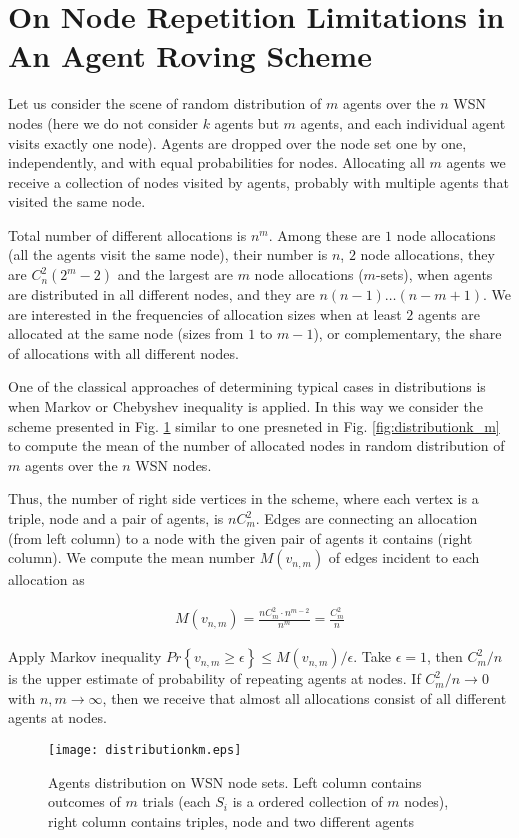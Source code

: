 \documentclass[conference]{IEEEtran}
\begin{document}
\section{On Node Repetition Limitations in An Agent Roving Scheme}

Let us consider the scene of random distribution of $m$ agents over the $n$ WSN nodes (here we do not consider $k$ agents but $m$ agents, and each individual agent visits exactly one node). Agents are dropped over the node set one by one, independently, and with equal probabilities for nodes. Allocating all $m$ agents we receive a collection of nodes visited by agents, probably with multiple agents that visited the same node.


Total number of different allocations is $n^{m}$. Among these are $1$ node allocations (all the agents visit the same node), their number is $n$, $2$ node allocations, they are $C_{n}^{2}\left(2^{m}-2\right)$ and the largest are $m$ node allocations ($m$-sets), when agents are distributed in all different nodes, and they are $n(n-1)\ldots (n-m+1)$. We are interested in the frequencies of allocation sizes when at least $2$ agents are allocated at the same node (sizes from $1$ to $m-1$), or complementary, the share of allocations with all different nodes. 


One of the classical approaches of determining typical cases in distributions is when Markov or Chebyshev inequality is applied. In this way we consider the scheme presented in Fig. \ref{fig:distributionkm} similar to one presneted in Fig. \ref{fig:distributionk_m} to compute the mean of the number of allocated nodes in random distribution of $m$ agents over the $n$ WSN nodes.


Thus, the number of right side vertices in the scheme, where each vertex is a triple, node and a pair of agents, is $nC_{m}^{2}$. Edges are connecting an allocation (from left column) to a node with the given pair of agents it contains (right column). We compute the mean number $M(v_{n,m})$ of edges incident to each allocation as

\begin{align}
M(v_{n,m})=\frac{nC_{m}^{2} \cdot n^{m-2}}{n^{m}}=\frac{C_{m}^{2}}{n}
\end{align}

Apply Markov inequality $Pr\left\{v_{n,m} \geq \epsilon \right\} \leq M(v_{n,m}) / \epsilon$. Take $\epsilon=1$, then $C_{m}^{2}/n$ is the upper estimate of probability of repeating agents at nodes. If $C_{m}^{2}/n \rightarrow 0$ with $n,m \rightarrow \infty$, then we receive that almost all allocations consist of all different agents at nodes.
\begin{figure}[tb]
\begin{center}
\begin{minipage}[h]{\linewidth}
\texttt{[image: distributionkm.eps]}
\end{minipage}
\end{center}
\caption{Agents distribution on WSN node sets. Left column contains outcomes of $m$ trials (each $S_{i}$ is a ordered collection of $m$ nodes), right column contains triples, node and two different agents}
\label{fig:distributionkm}
\end{figure}
\end{document}
